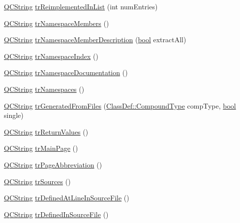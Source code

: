 \begin{DoxyCompactItemize}
\item 
\hyperlink{class_q_c_string}{Q\+C\+String} \hyperlink{class_translator_polish_ab10c7bca3bfb29ce5fb16265b86afdef}{tr\+Reimplemented\+In\+List} (int num\+Entries)
\item 
\hyperlink{class_q_c_string}{Q\+C\+String} \hyperlink{class_translator_polish_a42107865ec985e1f36ee2f251cba3760}{tr\+Namespace\+Members} ()
\item 
\hyperlink{class_q_c_string}{Q\+C\+String} \hyperlink{class_translator_polish_a2d92c886d795fc270e91223ac0bc6984}{tr\+Namespace\+Member\+Description} (\hyperlink{qglobal_8h_a1062901a7428fdd9c7f180f5e01ea056}{bool} extract\+All)
\item 
\hyperlink{class_q_c_string}{Q\+C\+String} \hyperlink{class_translator_polish_a0502d51337eb975b337ae7ec579fd23d}{tr\+Namespace\+Index} ()
\item 
\hyperlink{class_q_c_string}{Q\+C\+String} \hyperlink{class_translator_polish_a841e96dec3b0c1f25eb120cfec6acba3}{tr\+Namespace\+Documentation} ()
\item 
\hyperlink{class_q_c_string}{Q\+C\+String} \hyperlink{class_translator_polish_ac4d9d7b38ecf2340250c574e3982b4c1}{tr\+Namespaces} ()
\item 
\hyperlink{class_q_c_string}{Q\+C\+String} \hyperlink{class_translator_polish_abe9db80c7167df1755c7e58f6f2dcfb6}{tr\+Generated\+From\+Files} (\hyperlink{class_class_def_ae70cf86d35fe954a94c566fbcfc87939}{Class\+Def\+::\+Compound\+Type} comp\+Type, \hyperlink{qglobal_8h_a1062901a7428fdd9c7f180f5e01ea056}{bool} single)
\item 
\hyperlink{class_q_c_string}{Q\+C\+String} \hyperlink{class_translator_polish_a64ed3d915abcab0248d06de14478c910}{tr\+Return\+Values} ()
\item 
\hyperlink{class_q_c_string}{Q\+C\+String} \hyperlink{class_translator_polish_a033eef7792589d29b8a22048d6181a25}{tr\+Main\+Page} ()
\item 
\hyperlink{class_q_c_string}{Q\+C\+String} \hyperlink{class_translator_polish_a1ab1467678c57a72f34102a46c9f1b98}{tr\+Page\+Abbreviation} ()
\item 
\hyperlink{class_q_c_string}{Q\+C\+String} \hyperlink{class_translator_polish_abe9630260a7a927510929ae1e2fe5be2}{tr\+Sources} ()
\item 
\hyperlink{class_q_c_string}{Q\+C\+String} \hyperlink{class_translator_polish_ad83d6e77bfb1873911f888cc35ee54d8}{tr\+Defined\+At\+Line\+In\+Source\+File} ()
\item 
\hyperlink{class_q_c_string}{Q\+C\+String} \hyperlink{class_translator_polish_ad3838577d88a92b7a40bae9724da5830}{tr\+Defined\+In\+Source\+File} ()

\end{DoxyCompactItemize}
